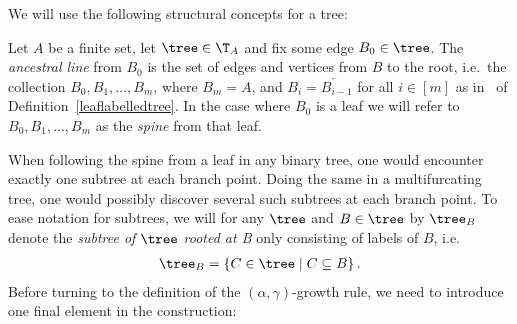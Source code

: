 We will use the following structural concepts for a tree:
%
\begin{defi}
  Let $A$ be a finite set, let $\tree \in \T_A$ and fix some edge $B_0 \in \tree$.
  The \textit{ancestral line} from $B_0$ is the set of edges and vertices from $B$ to the root, i.e.\ the collection $B_0, B_1, \ldots, B_m$, where $B_m = A$, and $B_i = \overleftarrow{B_{i-1}}$ for all $i \in [m]$ as in~ of Definition~\ref{leaflabelledtree}.
  In the case where $B_0$ is a leaf we will refer to $B_0, B_1, \ldots, B_m$ as the \textit{spine} from that leaf.
\end{defi}
%
When following the spine from a leaf in any binary tree, one would encounter exactly one subtree at each branch point.
Doing the same in a multifurcating tree, one would possibly discover several such subtrees at each branch point.
To ease notation for subtrees, we will for any $\tree$ and $B \in \tree$ by $\tree_B$ denote the \textit{subtree of $\tree$ rooted at B} only consisting of labels of $B$, i.e.
%
\begin{align}
  \tree_B = \left\{ C \in \tree \mid C \subseteq B \right\}.
  \label{subtreenotation}
\end{align}
%
Before turning to the definition of the $(\alpha, \gamma)$-growth rule, we need to introduce one final element in the construction:
%
